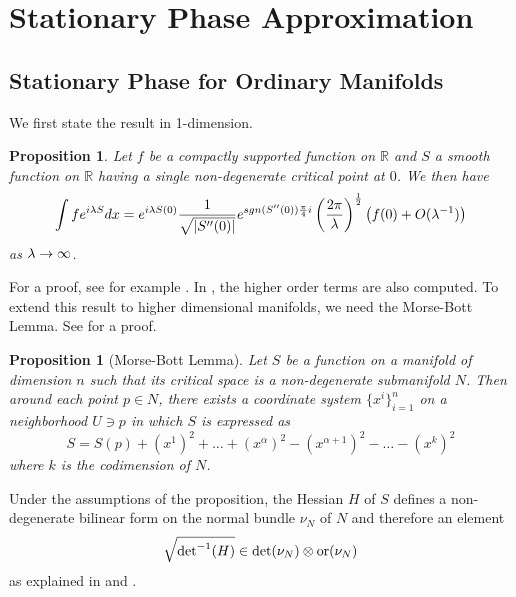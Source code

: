 \documentclass[11pt]{amsart}
\numberwithin{equation}{section}
\numberwithin{figure}{section}
\theoremstyle{plain}
\newtheorem{prop}[thm]{Proposition}
\theoremstyle{definition}
\theoremstyle{remark}
\begin{document}
\section{Stationary Phase Approximation\label{sec:Stationary-Phase-Approximation}}


\subsection{Stationary Phase for Ordinary Manifolds}

We first state the result in 1-dimension.
\begin{prop}
\label{prop:1-d_stationary_phase} Let $f$ be a compactly supported
function on $\mathbb{R}$ and $S$ a smooth function on $\mathbb{R}$
having a single non-degenerate critical point at $0$. We then have
\[
\int fe^{i\lambda S}dx=e^{i\lambda S(0)}\frac{1}{\sqrt{\lvert S''(0)\rvert}}e^{sgn(S''(0))\frac{\pi}{4}i}\left(\frac{2\pi}{\lambda}\right)^{\frac{1}{2}}\left(f(0)+O(\lambda^{-1})\right)
\]
as $\lambda\rightarrow\infty$.
\end{prop}
For a proof, see for example \cite{asymptotics,bott_critical_point}.
In \cite{bott_critical_point}, the higher order terms are also computed.
To extend this result to higher dimensional manifolds, we need the
Morse-Bott Lemma. See \cite{morse_bott} for a proof.
\begin{prop}[Morse-Bott Lemma]
\label{prop:Morse-Bott} Let $S$ be a function on a manifold of
dimension $n$ such that its critical space is a non-degenerate submanifold
$N$. Then around each point $p\in N$, there exists a coordinate
system $\{x^{i}\}_{i=1}^{n}$ on a neighborhood $U\ni p$ in which
$S$ is expressed as 
\[
S=S(p)+\left(x^{1}\right)^{2}+\dots+\left(x^{\alpha}\right)^{2}-\left(x^{\alpha+1}\right)^{2}-\dots-\left(x^{k}\right)^{2}
\]
where $k$ is the codimension of $N$. 
\end{prop}
Under the assumptions of the proposition, the Hessian $H$ of $S$
defines a non-degenerate bilinear form on the normal bundle $\nu_{N}$
of $N$ and therefore an element
\[
\sqrt{\mbox{det}^{-1}(H)}\in\det(\nu_{N})\otimes\mathrm{or}(\nu_{N})
\]
as explained in  and .
\end{document}
